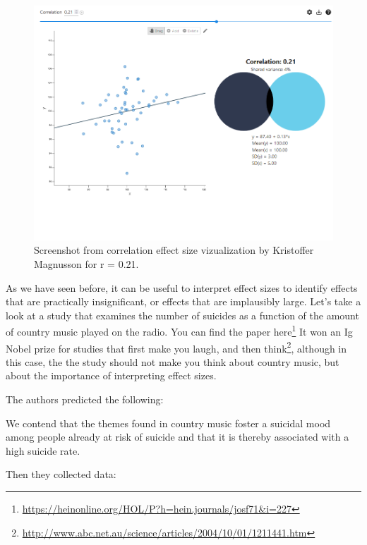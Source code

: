 \documentclass[
  oneside]{krantz}
\renewenvironment{quote}{\begin{VF}}{\end{VF}}
\renewcommand{\href}[2]{#2\footnote{\url{#1}}}
\begin{document}
\begin{figure}

{\centering \includegraphics[width=1\linewidth]{images/sharedvariance} 

}

\caption{Screenshot from correlation effect size vizualization by Kristoffer Magnusson for r = 0.21.}\label{fig:sharedvariance}
\end{figure}

As we have seen before, it can be useful to interpret effect sizes to identify effects that are practically insignificant, or effects that are implausibly large. Let's take a look at a study that examines the number of suicides as a function of the amount of country music played on the radio. You can find the paper \href{https://heinonline.org/HOL/P?h=hein.journals/josf71\&i=227}{here} It won an \href{http://www.abc.net.au/science/articles/2004/10/01/1211441.htm}{Ig Nobel prize for studies that first make you laugh, and then think}, although in this case, the the study should not make you think about country music, but about the importance of interpreting effect sizes.

The authors predicted the following:

\begin{quote}
We contend that the themes found in country music foster a suicidal mood among people already at risk of suicide and that it is thereby associated with a high suicide rate.
\end{quote}

Then they collected data:
\end{document}
